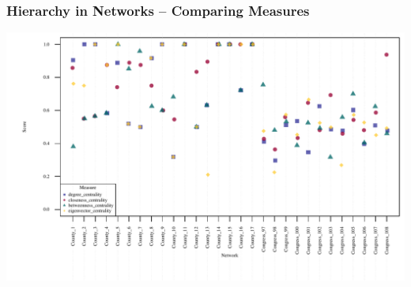 \documentclass[xcolor={table}]{beamer}
\newenvironment{changemargin}[2]{%
  \begin{list}{}{%
    \setlength{\topsep}{0pt}%
    \setlength{\leftmargin}{#1}%
    \setlength{\rightmargin}{#2}%
    \setlength{\listparindent}{\parindent}%
    \setlength{\itemindent}{\parindent}%
    \setlength{\parsep}{\parskip}%
  }%
  \item[]}{\end{list}}
\begin{document}
\begin{frame}\frametitle{Hierarchy in Networks -- Comparing Measures}
\begin{changemargin}{-2cm}{ -2cm}
	\centering
\includegraphics[scale = 0.65]{images/Measure_Scores.pdf}
\end{changemargin}
\end{frame}
\end{document}
